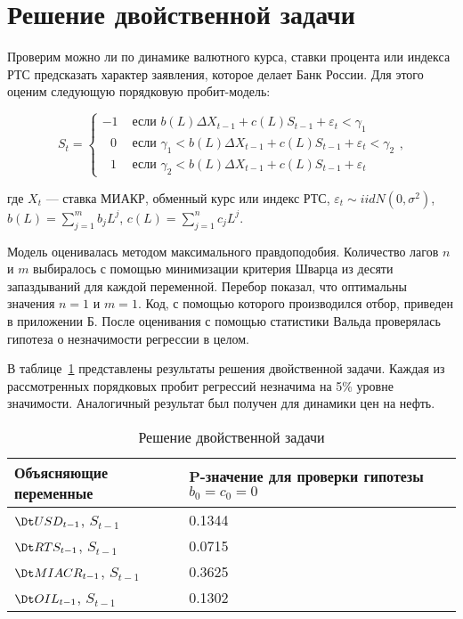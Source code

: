\section{Решение двойственной задачи}

Проверим можно ли по динамике валютного курса, ставки процента или индекса РТС предсказать характер заявления, которое делает Банк России. Для этого оценим следующую порядковую пробит-модель:

\begin{equation}
S_t = \begin{cases} -1 &\text{ если } b(L) \Delta X_{t-1} + c(L) S_{t-1} + \varepsilon_t < \gamma_1 \\
\mbox{ }0 &\text{ если } \gamma_1 < b(L) \Delta X_{t-1} + c(L) S_{t-1} + \varepsilon_t < \gamma_2 \\
\mbox{ }1 &\text{ если } \gamma_2 < b(L) \Delta X_{t-1} + c(L) S_{t-1} + \varepsilon_t 
\end{cases}, 
\end{equation}

где $X_{t}$ --- ставка МИАКР, обменный курс или индекс РТС, $\varepsilon_t \sim iid N (0, \sigma^2)$, $b(L) = \sum_{j=1}^m b_j L^j$, $c(L) = \sum_{j=1}^n c_j L^j$.

Модель оценивалась методом максимального правдоподобия. Количество лагов $n$ и $m$ выбиралось с помощью минимизации критерия Шварца из десяти запаздываний для каждой переменной. Перебор показал, что оптимальны значения $n=1$ и $m=1$. Код, с помощью которого производился отбор, приведен в приложении Б. После оценивания с помощью статистики Вальда проверялась гипотеза о незначимости регрессии в целом.

В таблице~\ref{stask} представлены результаты решения двойственной задачи. Каждая из рассмотренных порядковых пробит регрессий незначима на 5\% уровне значимости. Аналогичный результат был получен для динамики цен на нефть. 

\begin{table}[H]
	\begin{center}
		\caption{Решение двойственной задачи}\label{stask}
		\begin{tabular}{|m{6cm}|m{4cm}|}
\hline
Объясняющие переменные & P-значение для проверки гипотезы $b_0 = c_0 =0$  \\ \hline
$\Dt USD_{t-1}$, $S_{t-1}$ & 0.1344   \\ \hline
$\Dt RTS_{t-1}$, $S_{t-1}$ & 0.0715   \\ \hline
$\Dt MIACR_{t-1}$, $S_{t-1}$ & 0.3625   \\ \hline
$\Dt OIL_{t-1}$, $S_{t-1}$ & 0.1302   \\ \hline
		\end{tabular}
	\end{center}
\end{table}

